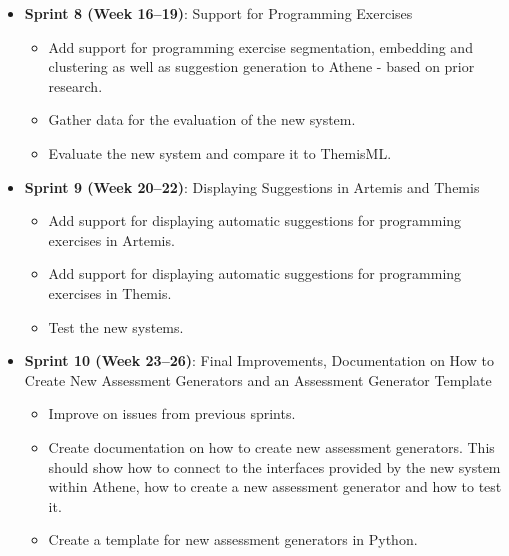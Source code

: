 \begin{itemize}
\begin{itemize}
    \end{itemize}
    \item \textbf{Sprint 8 (Week 16--19)}: Support for Programming Exercises
    \begin{itemize}
        \item Add support for programming exercise segmentation, embedding and clustering as well as suggestion generation to Athene - based on prior research.
        \item Gather data for the evaluation of the new system.
        \item Evaluate the new system and compare it to ThemisML.
    \end{itemize}
    \item \textbf{Sprint 9 (Week 20--22)}: Displaying Suggestions in Artemis and Themis
    \begin{itemize}
        \item Add support for displaying automatic suggestions for programming exercises in Artemis.
        \item Add support for displaying automatic suggestions for programming exercises in Themis.
        \item Test the new systems.
    \end{itemize}
    \item \textbf{Sprint 10 (Week 23--26)}: Final Improvements, Documentation on How to Create New Assessment Generators and an Assessment Generator Template
    \begin{itemize}
        \item Improve on issues from previous sprints.
        \item Create documentation on how to create new assessment generators. This should show how to connect to the interfaces provided by the new system within Athene, how to create a new assessment generator and how to test it.
        \item Create a template for new assessment generators in Python.
    \end{itemize}

\end{itemize}


\clearpage

\clearpage




